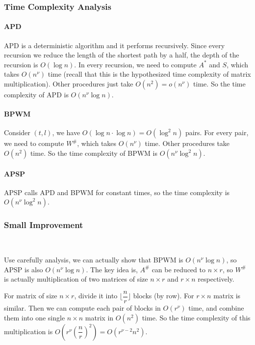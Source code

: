 \documentclass[12pt]{article}
\begin{document}
\subsubsection{Time Complexity Analysis}

\paragraph{APD} APD is a deterministic algorithm and it performs recursively. Since every recursion we reduce the length of the shortest path by a half, the depth of the recursion is $O(\log n)$. In every recursion, we need to compute $A^*$ and $S$, which takes $O(n^{\nu})$ time (recall that this is the hypothesized time complexity of matrix multiplication). Other procedures just take $O(n^2)=o(n^{\nu})$ time. So the time complexity of APD is $O(n^{\nu}\log n)$.

\paragraph{BPWM} Consider $(t,l)$, we have $O(\log n\cdot \log n)=O(\log^2 n)$ pairs. For every pair, we need to compute $W^{\#}$, which takes $O(n^{\nu})$ time. Other procedures take $O(n^2)$ time. So the time complexity of BPWM is $O(n^{\nu}\log^2 n)$.

\paragraph{APSP} APSP calls APD and BPWM for constant times, so the time complexity is $O(n^{\nu}\log^2 n)$.

\subsubsection{Small Improvement}
\label{imp}\

Use carefully analysis, we can actually show that BPWM is $O(n^\nu \log n)$, so APSP is also $O(n^\nu \log n)$. The key idea is, $A^\#$ can be reduced to $n\times r$, so $W^\#$ is actually multiplication of two matrices of size $n\times r$ and $r\times n$ respectively.

For matrix of size $n\times r$, divide it into $\lfloor\dfrac{n}{r}\rfloor$ blocks (by row). For $r\times n$ matrix is similar. Then we can compute each pair of blocks in $O(r^{\nu})$ time, and combine them into one single $n\times n$ matrix in $O(n^2)$ time. So the time complexity of this multiplication is $O(r^\nu(\dfrac{n}{r})^2)=O(r^{\nu-2}n^2)$.
\end{document}

